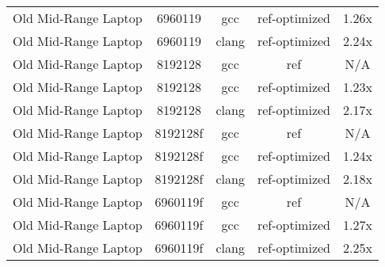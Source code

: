\begin{table}[H]
\begin{tabularx}{\linewidth}{X c c c c}
        Old Mid-Range Laptop &              6960119 &                  gcc &        ref-optimized &                1.26x\\
        Old Mid-Range Laptop &              6960119 &                clang &        ref-optimized &                2.24x\\
        Old Mid-Range Laptop &              8192128 &                  gcc &                  ref &                  N/A\\
        Old Mid-Range Laptop &              8192128 &                  gcc &        ref-optimized &                1.23x\\
        Old Mid-Range Laptop &              8192128 &                clang &        ref-optimized &                2.17x\\
        Old Mid-Range Laptop &             8192128f &                  gcc &                  ref &                  N/A\\
        Old Mid-Range Laptop &             8192128f &                  gcc &        ref-optimized &                1.24x\\
        Old Mid-Range Laptop &             8192128f &                clang &        ref-optimized &                2.18x\\
        Old Mid-Range Laptop &             6960119f &                  gcc &                  ref &                  N/A\\
        Old Mid-Range Laptop &             6960119f &                  gcc &        ref-optimized &                1.27x\\
        Old Mid-Range Laptop &             6960119f &                clang &        ref-optimized &                2.25x\\
        \bottomrule
    \end{tabularx}
\end{table}


